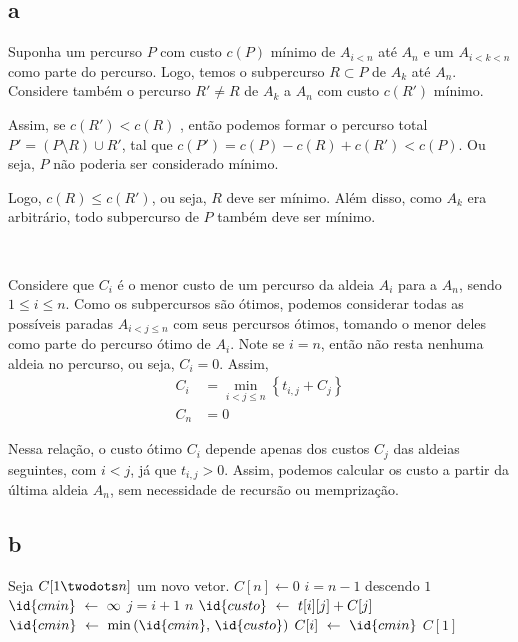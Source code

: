 \subsection{a}

Suponha um percurso $P$ com custo $c(P)$ mínimo de $A_{i < n}$ até $A_n$ e um $A_{i < k < n}$ como parte do percurso. Logo, temos o subpercurso $R \subset P$ de $A_k$ até $A_n$. Considere também o percurso $R' \ne R$ de $A_k$ a $A_n$ com custo $c\left(R'\right)$ mínimo.

Assim, se $c\left(R'\right) < c(R)$ , então podemos formar o percurso total $P' = (P \setminus R) \cup R'$, tal que $c\left(P'\right) = c(P) - c(R) + c\left(R'\right) < c(P)$. Ou seja, $P$ não poderia ser considerado mínimo.

Logo, $c(R) \leq c\left(R'\right)$, ou seja, $R$ deve ser mínimo. Além disso, como $A_k$ era arbitrário, todo subpercurso de $P$ também deve ser mínimo.

~

Considere que $C_i$ é o menor custo de um percurso da aldeia $A_i$ para a $A_n$, sendo $1 \leq i \leq n$. Como os subpercursos são ótimos, podemos considerar todas as possíveis paradas $A_{i < j \leq n}$ com seus percursos ótimos, tomando o menor deles como parte do percurso ótimo de $A_i$. Note se $i = n$, então não resta nenhuma aldeia no percurso, ou seja, $C_i = 0$. Assim,
\begin{align*}
    C_i &= \min_{i < j \leq n}\left\{t_{i, j} + C_j\right\} \\
    C_n &= 0
\end{align*}

Nessa relação, o custo ótimo $C_i$ depende apenas dos custos $C_j$ das aldeias seguintes, com $i < j$, já que $t_{i, j} > 0$. Assim, podemos calcular os custo a partir da última aldeia $A_n$, sem necessidade de recursão ou memprização.

\subsection{b}

\begin{codebox}
    \li Seja $C[1 \twodots n]$ um novo vetor. \label{linha:a1:1}
    \li
    \li $C[n] \gets 0$ \label{linha:a1:2}
    \li {} $i = n - 1$ descendo  $1$
        \Do
    \li     $\id{cmin} \gets \infty$ \label{linha:a2:1}
    \li     {} $j = i + 1$  $n$
            \Do
    \li         $\id{custo} \gets t[i][j] + C[j]$ \label{linha:a3:1}
    \li         $\id{cmin} \gets \min\left(\id{cmin},\, \id{custo}\right)$ \label{linha:a3:2}
            \End
    \li     $C[i] \gets \id{cmin}$
        \End
    \li
    \li {} $C[1]$ \label{linha:a1:3}
\end{codebox}


